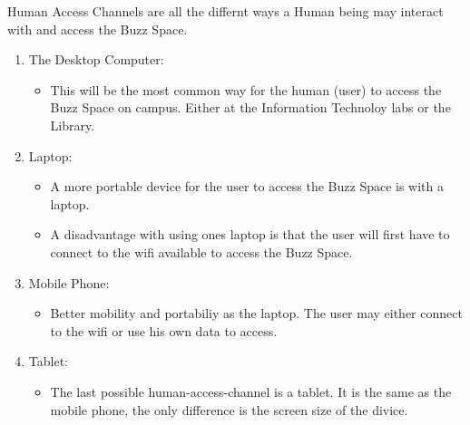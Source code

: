 Human Access Channels are all the differnt ways a Human being may interact with and access the Buzz Space.

\begin{enumerate}
	\item The Desktop Computer:
	\begin{itemize}
		\item This will be the most common way for the human (user) to access the Buzz Space on campus. 
		Either at the Information Technoloy labs or the Library.
	\end{itemize}
	\item Laptop:
	\begin{itemize}
		\item A more portable device for the user to access the Buzz Space is with a laptop.
		\item A disadvantage with using ones laptop is that the user will first have to connect to the wifi available to access the Buzz Space.
	\end{itemize}
	\item Mobile Phone:
	\begin{itemize}
		\item Better mobility and portabiliy as the laptop. The user may either connect to the wifi or use his own data to access.
	\end{itemize}
	\item Tablet:
	\begin{itemize}
		\item The last possible human-access-channel is a tablet. It is the same as the mobile phone, the only difference is the screen size of the divice.
	\end{itemize}
\end{enumerate} 